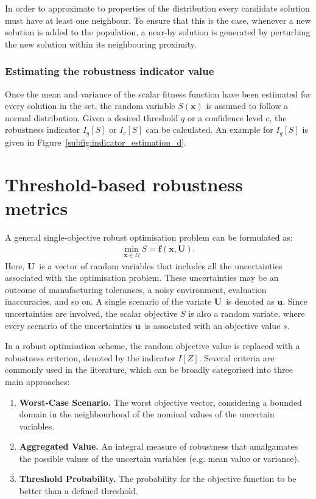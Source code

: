 \documentclass[10pt]{llncs}
\newcommand{\brr}[1]{{\left({#1}\right)}} %
\newcommand{\I}[1]{\ensuremath{I\!\left[{#1}\right]}} %
\newcommand{\Iq}[1]{\ensuremath{I_q\!\left[{#1}\right]}} %
\newcommand{\Ic}[1]{\ensuremath{I_c\!\left[{#1}\right]}} %
\newcommand{\vx}{\ensuremath{\mathbf{x}}} %
\newcommand{\vf}{\ensuremath{\mathbf{f}}} %
\newcommand{\vu}{\ensuremath{\mathbf{u}}} %
\newcommand{\vU}{\ensuremath{\mathbf{U}}} %
\begin{document}
In order to approximate to properties of the distribution every candidate solution must have at least one neighbour.
To ensure that this is the case, whenever a new solution is added to the population, a near-by solution is generated by perturbing the new solution within its neighbouring proximity.

\subsubsection{Estimating the robustness indicator value}
\label{subsubsec:robustness indicators}
Once the mean and variance of the scalar fitness function have been estimated for every solution in the set, the random variable $S\brr{\vx}$ is assumed to follow a normal distribution. Given a desired threshold $q$ or a confidence level $c$,  the robustness indicator $\Iq{S}$ or $\Ic{S}$ can be calculated. An example for $\Iq{S}$ is given in Figure~\ref{subfig:indicator_estimation_d}.

\section{Threshold-based robustness metrics}
\label{sec:Robustness Indicators}
A general single-objective robust optimisation problem can be formulated as:
\begin{align}
\label{eq:rev:robust}
\min_{\vx\in\Omega} S=\vf\brr{\vx,\vU}.
\end{align}
Here, \vU\ is a vector of random variables that includes all the uncertainties associated with the optimisation problem. These uncertainties may be an outcome of manufacturing tolerances, a noisy environment, evaluation inaccuracies, and so on. A single scenario of the variate \vU\ is denoted as \vu. Since uncertainties are involved, the scalar objective $S$ is also a random variate, where every scenario of the uncertainties \vu\ is associated with an objective value $s$.

In a robust optimisation scheme, the random objective value is replaced with a robustness criterion, denoted by the indicator \I{Z}. Several criteria are commonly used in the literature, which can be broadly categorised into three main approaches:
\begin{enumerate}
%
\item \textbf{Worst-Case Scenario.} The worst objective vector, considering a bounded domain in the neighbourhood of the nominal values of the uncertain variables.
%
\item \textbf{Aggregated Value.} An integral measure of robustness that amalgamates the possible values of the uncertain variables (e.g. mean value or variance).
%
\item \textbf{Threshold Probability.} The probability for the objective function to be better than a defined threshold.
\end{enumerate}
\end{document}
